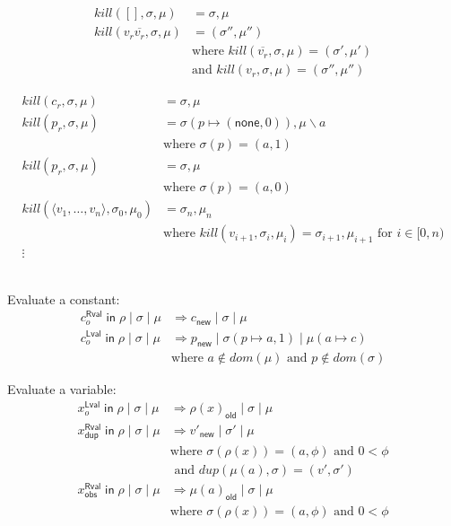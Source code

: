 \documentclass{article}
\newcommand{\IN}{\mathop{\mathsf{in}}}
\newcommand{\RVAL}{\mathsf{Rval}}
\newcommand{\LVAL}{\mathsf{Lval}}
\newcommand{\DUP}{\mathsf{dup}}
\newcommand{\OBS}{\mathsf{obs}}
\newcommand{\INCTX}[4]{\boxed{#1}^{#2}_{#3} \IN #4}
\newcommand{\act}{\text{\ae}}
\begin{document}
\begin{align*}
\mathit{kill}([], \sigma,\mu) &= \sigma,\mu\\
\mathit{kill}(v_r \overline{v_r}, \sigma,\mu) &= (\sigma'', \mu'') \\
 & \text{where } \mathit{kill}(\overline{v_r}, \sigma,\mu) = (\sigma',\mu')\\
 & \text{and } \mathit{kill}(v_r, \sigma,\mu) = (\sigma'',\mu'')
\end{align*}

\begin{align*}
\mathit{kill}(c_r, \sigma,\mu) &= \sigma,\mu\\
\mathit{kill}(p_r, \sigma,\mu) &=  \sigma(p \mapsto (\mathsf{none},0)), \mu \backslash a \\
   & \text{where } \sigma(p) = (a, 1) \\
\mathit{kill}(p_r, \sigma,\mu) &=  \sigma, \mu \\
  & \text{where } \sigma(p) = (a, 0) \\
\mathit{kill}(\langle v_1,\ldots,v_n \rangle, \sigma_0, \mu_0) &= \sigma_n, \mu_n\\
& \text{where } \mathit{kill}(v_{i+1},\sigma_i,\mu_i) = \sigma_{i+1},\mu_{i+1}
\text{ for } i\in [0,n) \\
  \vdots
\end{align*}

\fbox{$\act \mid \sigma \mid \mu \Rightarrow v_r \mid \sigma' \mid \mu'$}\\

\noindent Evaluate a constant:
\begin{align*}
  \INCTX{c}{\RVAL}{o}{\rho} \mid \sigma \mid \mu  &
     \Rightarrow c_{\mathsf{new}} \mid \sigma \mid \mu \\
  \INCTX{c}{\LVAL}{o}{\rho} \mid \sigma \mid \mu &
     \Rightarrow p_{\mathsf{new}} \mid \sigma(p \mapsto a, 1) \mid \mu(a \mapsto c) \\
     & \text{where } a \notin \mathit{dom}(\mu)
     \text{ and } p \notin \mathit{dom}(\sigma)
\end{align*}

\noindent Evaluate a variable:
\begin{align*}
 \INCTX{x}{\LVAL}{o}{\rho} \mid \sigma \mid \mu &
      \Rightarrow \rho(x)_{\mathsf{old}} \mid \sigma \mid \mu \\
  \INCTX{x}{\RVAL}{\DUP}{\rho} \mid \sigma \mid \mu  &
     \Rightarrow v'_{\mathsf{new}} \mid \sigma' \mid \mu\\
     & \text{where } \sigma(\rho(x)) = (a, \phi) 
       \text{ and } 0 < \phi \\
     &  \text{ and } \mathit{dup}(\mu(a),\sigma) = (v',\sigma') \\
 \INCTX{x}{\RVAL}{\OBS}{\rho} \mid \sigma \mid \mu &
      \Rightarrow \mu(a)_{\mathsf{old}} \mid \sigma \mid \mu\\
     & \text{where } \sigma(\rho(x)) = (a, \phi) 
       \text{ and } 0 < \phi 
\end{align*}
\end{document}
